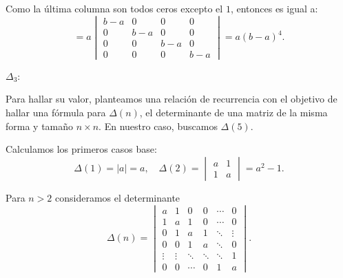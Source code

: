 \documentclass[a4paper,12pt]{article}
\begin{document}
\begin{ejercicio}[title=Ejercicio 40]
Como la última columna son todos ceros excepto el $1$, entonces es igual a:
\[
= a
\begin{vmatrix}
b-a & 0 & 0 & 0\\
0 & b-a & 0 & 0\\
0 & 0 & b-a & 0\\
0 & 0 & 0 & b-a
\end{vmatrix}
= \boxed{a(b-a)^4}.
\]

$\Delta_3$:

\vspace{0.5em}

Para hallar su valor, planteamos una relación de recurrencia con el objetivo de hallar una fórmula para $\Delta(n)$, el determinante de una matriz de la misma forma y tamaño $n \times n$. En nuestro caso, buscamos $\Delta(5)$.

\vspace{0.5em}

Calculamos los primeros casos base:
\[
\Delta(1) = |a| = a, \quad \Delta(2) = \begin{vmatrix} a & 1 \\ 1 & a \end{vmatrix} = a^2 - 1.
\]

Para $n>2$ consideramos el determinante
\[
\Delta(n)=
\begin{vmatrix}
a & 1 & 0 & 0 & \cdots & 0\\
1 & a & 1 & 0 & \cdots & 0\\
0 & 1 & a & 1 & \ddots & \vdots\\
0 & 0 & 1 & a & \ddots & 0\\
\vdots & \vdots & \ddots & \ddots & \ddots & 1\\
0 & 0 & \cdots & 0 & 1 & a
\end{vmatrix}.
\]
\end{ejercicio}
\end{document}
